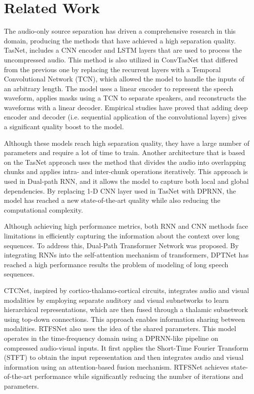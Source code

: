 \documentclass[10pt,conference,compsocconf]{IEEEtran}
\begin{document}
\section{Related Work}\label{sec:related_work}

The audio-only source separation has driven a comprehensive research in this domain, producing the methods that have achieved a high separation quality. TasNet\cite{luo2018tasnet}, includes a CNN encoder and LSTM layers that are used to process the uncompressed audio. This method is also utilized in ConvTasNet\cite{luo2019convtasnet} that differed from the previous one by replacing the recurrent layers with a Temporal Convolutional Network (TCN), which allowed the model to handle the inputs of an arbitrary length. The model uses a linear encoder to represent the speech waveform, applies masks using a TCN to separate speakers, and reconstructs the waveforms with a linear decoder. Empirical studies\cite{kadioglu2020empirical} have proved that adding deep encoder and decoder (i.e. sequential application of the convolutional layers) gives a significant quality boost to the model.

Although these models reach high separation quality, they have a large number of parameters and require a lot of time to train. Another architecture that is based on the TasNet approach uses the method that divides the audio into overlapping chunks and applies intra- and inter-chunk operations iteratively. This approach is used in Dual-path RNN\cite{luo2020dprnn}, and it allows the model to capture both local and global dependencies. By replacing 1-D CNN layer used in TasNet with DPRNN, the model has reached a new state-of-the-art quality while also reducing the computational complexity.

Although achieving high performance metrics, both RNN and CNN methods face limitations in efficiently capturing the information about the context over long sequences. To address this, Dual-Path Transformer Network\cite{chen2020dptnet} was proposed. By integrating RNNs into the self-attention mechanism of transformers, DPTNet has reached a high performance results the problem of modeling of long speech sequences.

CTCNet\cite{li2022ctcnet}, inspired by cortico-thalamo-cortical circuits, integrates audio and visual modalities by employing separate auditory and visual subnetworks to learn hierarchical representations, which are then fused through a thalamic subnetwork using top-down connections. This approach enables information sharing between modalities. RTFSNet\cite{pegg2024rtfsnet} also uses the idea of the shared parameters. This model operates in the time-frequency domain using a DPRNN-like pipeline on compressed audio-visual inputs. It first applies the Short-Time Fourier Transform (STFT) to obtain the input representation and then integrates audio and visual information using an attention-based fusion mechanism. RTFSNet achieves state-of-the-art performance while significantly reducing the number of iterations and parameters.
\end{document}
